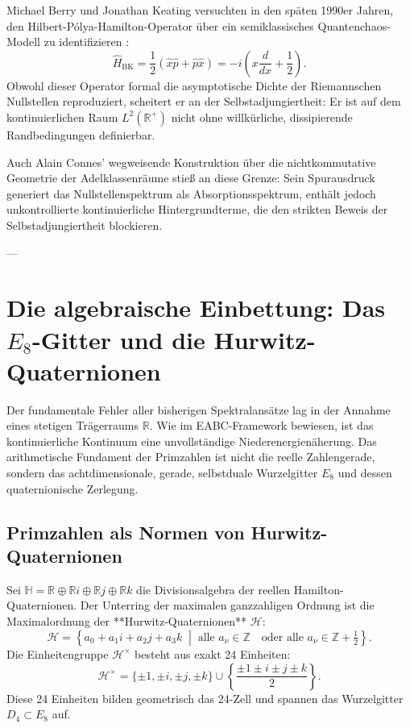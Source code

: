 \documentclass[11pt,a4paper]{article}
\theoremstyle{definition}
\theoremstyle{remark}
\numberwithin{equation}{section}
\begin{document}
Michael Berry und Jonathan Keating versuchten in den späten 1990er Jahren, den Hilbert-Pólya-Hamilton-Operator über ein semiklassisches Quantenchaos-Modell zu identifizieren \cite{BerryKeating1999}:
\begin{equation}
\hat{H}_{\mathrm{BK}} = \frac{1}{2} (\hat{x}\hat{p} + \hat{p}\hat{x}) = -i \left( x \frac{d}{dx} + \frac{1}{2} \right).
\end{equation}
Obwohl dieser Operator formal die asymptotische Dichte der Riemannschen Nullstellen reproduziert, scheitert er an der Selbstadjungiertheit: Er ist auf dem kontinuierlichen Raum $L^2(\mathbb{R}^+)$ nicht ohne willkürliche, dissipierende Randbedingungen definierbar. 

Auch Alain Connes' wegweisende Konstruktion über die nichtkommutative Geometrie der Adelklassenräume \cite{Connes1999} stieß an diese Grenze: Sein Spurausdruck generiert das Nullstellenspektrum als Absorptionsspektrum, enthält jedoch unkontrollierte kontinuierliche Hintergrundterme, die den strikten Beweis der Selbstadjungiertheit blockieren.

---

\section{Die algebraische Einbettung: Das $E_8$-Gitter und die Hurwitz-Quaternionen}

Der fundamentale Fehler aller bisherigen Spektralansätze lag in der Annahme eines stetigen Trägerraums $\mathbb{R}$. Wie im EABC-Framework bewiesen, ist das kontinuierliche Kontinuum eine unvollständige Niederenergienäherung. Das arithmetische Fundament der Primzahlen ist nicht die reelle Zahlengerade, sondern das achtdimensionale, gerade, selbstduale Wurzelgitter $E_8$ und dessen quaternionische Zerlegung.

\subsection{Primzahlen als Normen von Hurwitz-Quaternionen}

Sei $\mathbb{H} = \mathbb{R} \oplus \mathbb{R}i \oplus \mathbb{R}j \oplus \mathbb{R}k$ die Divisionsalgebra der reellen Hamilton-Quaternionen. Der Unterring der maximalen ganzzahligen Ordnung ist die Maximalordnung der **Hurwitz-Quaternionen** $\mathcal{H}$:
\begin{equation}
\mathcal{H} = \left\{ a_0 + a_1 i + a_2 j + a_3 k \;\middle|\; \text{alle } a_\nu \in \mathbb{Z} \quad \text{oder alle } a_\nu \in \mathbb{Z} + \tfrac{1}{2} \right\}.
\end{equation}
Die Einheitengruppe $\mathcal{H}^\times$ besteht aus exakt 24 Einheiten:
\begin{equation}
\mathcal{H}^\times = \{ \pm 1, \pm i, \pm j, \pm k \} \cup \left\{ \frac{\pm 1 \pm i \pm j \pm k}{2} \right\}.
\end{equation}
Diese 24 Einheiten bilden geometrisch das 24-Zell und spannen das Wurzelgitter $D_4 \subset E_8$ auf.
\end{document}

